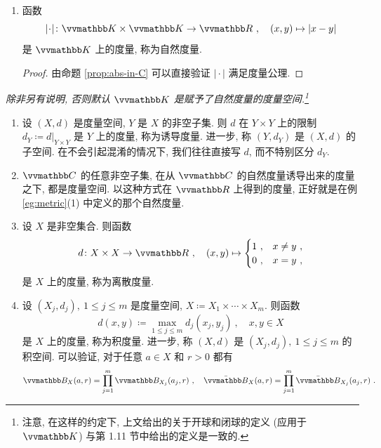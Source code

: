 \begin{example}\label{eg:metric}
    \begin{enumerate}
        \item 函数
        \[
            |\!\cdot\!| \colon \K \times \K \to \R\ ,\quad (x, y) \mapsto |x - y|
        \]
        是 \(\K\) 上的度量, 称为自然度量.
        \begin{proof}
            由命题 \ref{prop:abs-in-C} 可以直接验证 \(|\!\cdot\!|\) 满足度量公理.
        \end{proof}
    \end{enumerate}

    \begin{center}
        \textsl{除非另有说明, 否则默认 \(\K\) 是赋予了自然度量的度量空间.\footnote{注意, 在这样的约定下, 上文给出的关于开球和闭球的定义 (应用于 \(\K\)) 与第 1.11 节中给出的定义是一致的.}}
    \end{center}

    \begin{enumerate}[start=2]
        \item 设 \((X, d)\) 是度量空间, \(Y\) 是 \(X\) 的非空子集. 则 \(d\) 在 \(Y \times Y\) 上的限制 \(d_Y \coloneqq d|_{Y \times Y}\) 是 \(Y\) 上的度量, 称为诱导度量. 进一步, 称 \((Y, d_Y)\) 是 \((X, d)\) 的子空间. 在不会引起混淆的情况下, 我们往往直接写 \(d\), 而不特别区分 \(d_Y\).
        \item \(\C\) 的任意非空子集, 在从 \(\C\) 的自然度量诱导出来的度量之下, 都是度量空间. 以这种方式在 \(\R\) 上得到的度量, 正好就是在例 \ref{eg:metric}(1) 中定义的那个自然度量.
        \item 设 \(X\) 是非空集合. 则函数
        \[
            d \colon X \times X \to \R\ ,\quad (x, y) \mapsto
            \begin{cases}
                1\ , & x \neq y\ , \\
                0\ , & x = y\ ,
            \end{cases}
        \]
        是 \(X\) 上的度量, 称为离散度量.
        \item 设 \((X_j, d_j),\ 1 \leq j \leq m\) 是度量空间, \(X \coloneqq X_1 \times \cdots \times X_m\). 则函数
        \[
            d(x, y) \coloneqq \max_{1 \leq j \leq m} d_j(x_j, y_j)\ ,\quad x, y \in X
        \]
        是 \(X\) 上的度量, 称为积度量. 进一步, 称 \((X, d)\) 是 \((X_j, d_j),\ 1 \leq j \leq m\) 的积空间. 可以验证, 对于任意 \(a \in X\) 和 \(r > 0\) 都有
        \[
            \B_X(a, r) = \prod_{j = 1}^m \B_{X_j}(a_j, r)\ ,\quad \bar \B_X(a, r) = \prod_{j = 1}^m \bar \B_{X_j}(a_j, r)\ .
        \]
    \end{enumerate}
\end{example}

